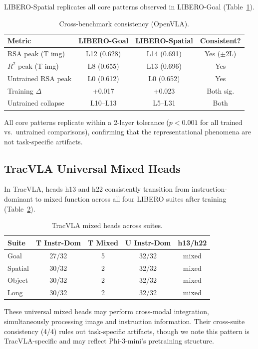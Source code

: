 \documentclass[10pt,twocolumn]{article}
\begin{document}
LIBERO-Spatial replicates all core patterns observed in LIBERO-Goal (Table~\ref{tab:cross_bench}).

\begin{table}[t]
\centering
\caption{Cross-benchmark consistency (OpenVLA).}
\label{tab:cross_bench}
\small
\begin{tabular}{lccc}
\toprule
Metric & LIBERO-Goal & LIBERO-Spatial & Consistent? \\
\midrule
RSA peak (T img) & L12 (0.628) & L14 (0.691) & Yes ($\pm$2L) \\
$R^2$ peak (T img) & L8 (0.655) & L13 (0.696) & Yes \\
Untrained RSA peak & L0 (0.612) & L0 (0.652) & Yes \\
Training $\Delta$ & +0.017 & +0.023 & Both sig. \\
Untrained collapse & L10--L13 & L5--L31 & Both \\
\bottomrule
\end{tabular}
\end{table}

All core patterns replicate within a 2-layer tolerance ($p < 0.001$ for all trained vs.\ untrained comparisons), confirming that the representational phenomena are not task-specific artifacts.

\subsection{TracVLA Universal Mixed Heads}
\label{sec:mixed}

In TracVLA, heads h13 and h22 consistently transition from instruction-dominant to mixed function across all four LIBERO suites after training (Table~\ref{tab:mixed}).

\begin{table}[t]
\centering
\caption{TracVLA mixed heads across suites.}
\label{tab:mixed}
\small
\begin{tabular}{lcccc}
\toprule
Suite & T Instr-Dom & T Mixed & U Instr-Dom & h13/h22 \\
\midrule
Goal & 27/32 & 5 & 32/32 & mixed \\
Spatial & 30/32 & 2 & 32/32 & mixed \\
Object & 30/32 & 2 & 32/32 & mixed \\
Long & 30/32 & 2 & 32/32 & mixed \\
\bottomrule
\end{tabular}
\end{table}

These universal mixed heads may perform cross-modal integration, simultaneously processing image and instruction information.
Their cross-suite consistency (4/4) rules out task-specific artifacts, though we note this pattern is TracVLA-specific and may reflect Phi-3-mini's pretraining structure.
\end{document}

